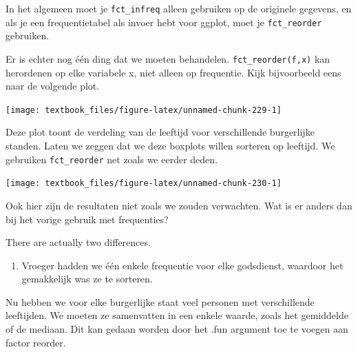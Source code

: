 \documentclass[]{tufte-book}
\newenvironment{Shaded}{}{}
\newcommand{\KeywordTok}[1]{\textcolor[rgb]{0.00,0.44,0.13}{\textbf{#1}}}
\newcommand{\NormalTok}[1]{#1}
\newcommand{\OperatorTok}[1]{\textcolor[rgb]{0.40,0.40,0.40}{#1}}
\newcommand{\StringTok}[1]{\textcolor[rgb]{0.25,0.44,0.63}{#1}}
\providecommand{\tightlist}{%
  \setlength{\itemsep}{0pt}\setlength{\parskip}{0pt}}
\begin{document}
In het algemeen moet je \texttt{fct\_infreq} alleen gebruiken op de originele gegevens, en als je een frequentietabel als invoer hebt voor ggplot, moet je \texttt{fct\_reorder} gebruiken.

Er is echter nog één ding dat we moeten behandelen. \texttt{fct\_reorder(f,x)} kan herordenen op elke variabele x, niet alleen op frequentie. Kijk bijvoorbeeld eens naar de volgende plot.

\begin{Shaded}
\end{Shaded}

\texttt{[image: textbook\_files/figure-latex/unnamed-chunk-229-1]}

Deze plot toont de verdeling van de leeftijd voor verschillende burgerlijke standen. Laten we zeggen dat we deze boxplots willen sorteren op leeftijd. We gebruiken \texttt{fct\_reorder} net zoals we eerder deden.

\begin{Shaded}
\end{Shaded}

\texttt{[image: textbook\_files/figure-latex/unnamed-chunk-230-1]}

Ook hier zijn de resultaten niet zoals we zouden verwachten. Wat is er anders dan bij het vorige gebruik met frequenties?

There are actually two differences.

\begin{enumerate}
\def\labelenumi{\arabic{enumi}.}
\tightlist
\item
  Vroeger hadden we één enkele frequentie voor elke godsdienst, waardoor het gemakkelijk was ze te sorteren.
\end{enumerate}

Nu hebben we voor elke burgerlijke staat veel personen met verschillende leeftijden. We moeten ze samenvatten in een enkele waarde, zoals het gemiddelde of de mediaan. Dit kan gedaan worden door het .fun argument toe te voegen aan factor reorder.
\end{document}
